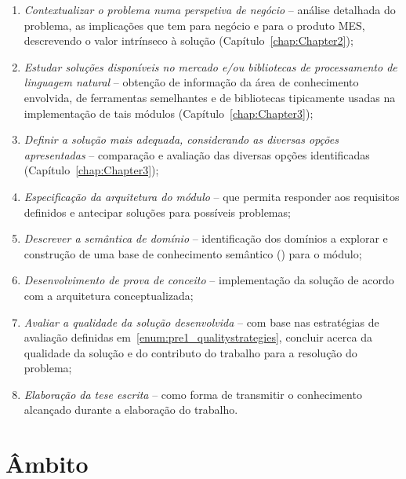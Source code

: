 \begin{enumerate}
    \item
    \label{enum:pre1_objectives_1}
    {
        \textit{Contextualizar o problema numa perspetiva de negócio} -- análise detalhada do problema, as implicações que tem para negócio e para o produto \gls{MES}, descrevendo o valor intrínseco à solução (Capítulo~\ref{chap:Chapter2});
    }
    \item
    \label{enum:pre1_objectives_2}
    {
        \textit{Estudar soluções disponíveis no mercado e/ou bibliotecas de processamento de linguagem natural} -- obtenção de informação da área de conhecimento envolvida, de ferramentas semelhantes e de bibliotecas tipicamente usadas na implementação de tais módulos (Capítulo~\ref{chap:Chapter3});
    }
    \item
    \label{enum:pre1_objectives_3}
    {
        \textit{Definir a solução mais adequada, considerando as diversas opções apresentadas} -- comparação e avaliação das diversas opções identificadas (Capítulo~\ref{chap:Chapter3});
    }
    \item
    \label{enum:pre1_objectives_4}
    {
        \textit{Especificação da arquitetura do módulo} -- que permita responder aos requisitos definidos e antecipar soluções para possíveis problemas;
    }
    \item
    \label{enum:pre1_objectives_5}
    {
        \textit{Descrever a semântica de domínio} -- identificação dos domínios a explorar e construção de uma base de conhecimento semântico () para o módulo;
    }
    \item
    \label{enum:pre1_objectives_6}
    {
        \textit{Desenvolvimento de prova de conceito} -- implementação da solução de acordo com a arquitetura conceptualizada;
    }
    \item
    \label{enum:pre1_objectives_7}
    {
        \textit{Avaliar a qualidade da solução desenvolvida} -- com base nas estratégias de avaliação definidas em~\ref{enum:pre1_qualitystrategies}, concluir acerca da qualidade da solução e do contributo do trabalho para a resolução do problema;
    }
    \item
    \label{enum:pre1_objectives_8}
    {
        \textit{Elaboração da tese escrita} -- como forma de transmitir o conhecimento alcançado durante a elaboração do trabalho.
    }
\end{enumerate}

\section{Âmbito}

